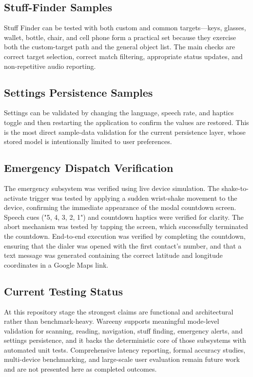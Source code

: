 \documentclass[12pt,a4paper]{report}
\begin{document}
\subsection{Stuff-Finder Samples}
Stuff Finder can be tested with both custom and common targets---keys, glasses, wallet, bottle, chair, and cell phone form a practical set because they exercise both the custom-target path and the general object list. The main checks are correct target selection, correct match filtering, appropriate status updates, and non-repetitive audio reporting.

\subsection{Settings Persistence Samples}
Settings can be validated by changing the language, speech rate, and haptics toggle and then restarting the application to confirm the values are restored. This is the most direct sample-data validation for the current persistence layer, whose stored model is intentionally limited to user preferences.

\subsection{Emergency Dispatch Verification}
The emergency subsystem was verified using live device simulation. The shake-to-activate trigger was tested by applying a sudden wrist-shake movement to the device, confirming the immediate appearance of the modal countdown screen. Speech cues ("5, 4, 3, 2, 1") and countdown haptics were verified for clarity. The abort mechanism was tested by tapping the screen, which successfully terminated the countdown. End-to-end execution was verified by completing the countdown, ensuring that the dialer was opened with the first contact's number, and that a text message was generated containing the correct latitude and longitude coordinates in a Google Maps link.

\subsection{Current Testing Status}
At this repository stage the strongest claims are functional and architectural rather than benchmark-heavy. Wareeny supports meaningful mode-level validation for scanning, reading, navigation, stuff finding, emergency alerts, and settings persistence, and it backs the deterministic core of those subsystems with automated unit tests. Comprehensive latency reporting, formal accuracy studies, multi-device benchmarking, and large-scale user evaluation remain future work and are not presented here as completed outcomes.
\end{document}
